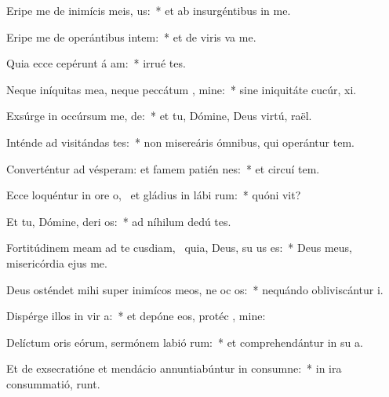\item Eripe me de inimícis meis,  us:~* et ab insurgéntibus in   me.
\item Eripe me de operántibus intem:~* et de viris  va me.
\item Quia ecce cepérunt á am:~* irrué   tes.
\item Neque iníquitas mea, neque peccátum , mine:~* sine iniquitáte cucúr,  xi.
\item Exsúrge in occúrsum me,  de:~* et tu, Dómine, Deus virtú,  raël.
\item Inténde ad visitándas  tes:~* non misereáris ómnibus, qui operántur tem.
\item Converténtur ad vésperam: et famem patién  nes:~* et circuí tem.
\item Ecce loquéntur in ore o,~\pscross{} et gládius in lábi rum:~* quóni  vit?
\item Et tu, Dómine, deri os:~* ad níhilum dedú  tes.
\item Fortitúdinem meam ad te cusdiam,~\pscross{} quia, Deus, su us es:~* Deus meus, misericórdia ejus  me.
\item Deus osténdet mihi super inimícos meos, ne oc os:~* nequándo obliviscántur  i.
\item Dispérge illos in vir a:~* et depóne eos, protéc , mine:
\item Delíctum oris eórum, sermónem labió rum:~* et comprehendántur in su a.
\item Et de exsecratióne et mendácio annuntiabúntur in consumne:~* in ira consummatió,   runt.
